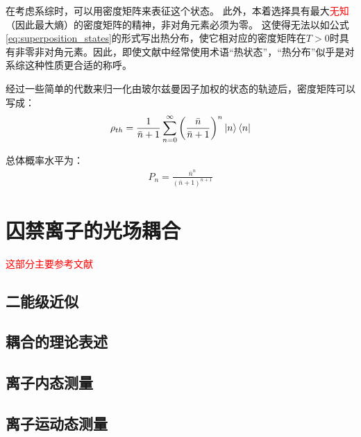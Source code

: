在考虑系综时，可以用密度矩阵来表征这个状态。
此外，本着选择具有最大\textcolor{red}{无知}（因此最大熵）的密度矩阵的精神，非对角元素必须为零。
这使得无法以如公式\eqref{eq:superposition_states}的形式写出热分布，使它相对应的密度矩阵在$T>0$时具有非零非对角元素。因此，即使文献中经常使用术语“热状态”，“热分布”似乎是对系综这种性质更合适的称呼。

经过一些简单的代数来归一化由玻尔兹曼因子加权的状态的轨迹后，密度矩阵可以写成：
\begin{align}
    \rho_{th}=\frac{1}{\bar{n}+1}\sum_{n=0}^{\infty}\left(\frac{\bar{n}}{\bar{n}+1}\right)^n\ket{n}\bra{n}
\end{align}

总体概率水平为：
\begin{align}
    P_n=\frac{\bar{n}^n}{(\bar{n}+1)^{n+1}}
\end{align}




\section[囚禁离子的光场耦合]{囚禁离子的光场耦合}
\textcolor{red}{这部分主要参考文献\cite[p3-8]{Leibfried_Blatt_Monroe_Wineland_2003}}


\subsection[二能级近似]{二能级近似}

\subsection[耦合的理论表述]{耦合的理论表述}

\subsection[离子内态测量]{离子内态测量}


\subsection[离子运动态测量]{离子运动态测量}















